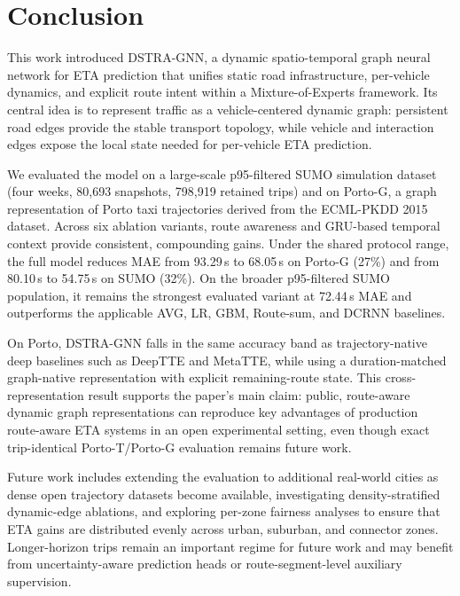 \section{Conclusion}\label{sec7}

This work introduced DSTRA-GNN, a dynamic spatio-temporal graph neural network for ETA prediction that unifies static road infrastructure, per-vehicle dynamics, and explicit route intent within a Mixture-of-Experts framework. Its central idea is to represent traffic as a vehicle-centered dynamic graph: persistent road edges provide the stable transport topology, while vehicle and interaction edges expose the local state needed for per-vehicle ETA prediction.

We evaluated the model on a large-scale p95-filtered SUMO simulation dataset (four weeks, 80{,}693 snapshots, 798{,}919 retained trips) and on Porto-G, a graph representation of Porto taxi trajectories derived from the ECML-PKDD 2015 dataset. Across six ablation variants, route awareness and GRU-based temporal context provide consistent, compounding gains. Under the shared protocol range, the full model reduces MAE from 93.29\,s to 68.05\,s on Porto-G (27\%) and from 80.10\,s to 54.75\,s on SUMO (32\%). On the broader p95-filtered SUMO population, it remains the strongest evaluated variant at 72.44\,s MAE and outperforms the applicable AVG, LR, GBM, Route-sum, and DCRNN baselines.

On Porto, DSTRA-GNN falls in the same accuracy band as trajectory-native deep baselines such as DeepTTE and MetaTTE, while using a duration-matched graph-native representation with explicit remaining-route state. This cross-representation result supports the paper's main claim: public, route-aware dynamic graph representations can reproduce key advantages of production route-aware ETA systems in an open experimental setting, even though exact trip-identical Porto-T/Porto-G evaluation remains future work.

Future work includes extending the evaluation to additional real-world cities as dense open trajectory datasets become available, investigating density-stratified dynamic-edge ablations, and exploring per-zone fairness analyses to ensure that ETA gains are distributed evenly across urban, suburban, and connector zones. Longer-horizon trips remain an important regime for future work and may benefit from uncertainty-aware prediction heads or route-segment-level auxiliary supervision.
